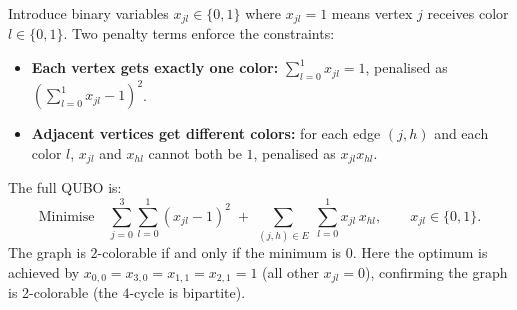\documentclass{ceri/sty/rapport}
\begin{document}
\begin{solution}
Introduce binary variables $x_{jl} \in \{0,1\}$ where $x_{jl} = 1$ means vertex $j$ receives color $l \in \{0,1\}$.
Two penalty terms enforce the constraints:
\begin{itemize}
  \item \textbf{Each vertex gets exactly one color:} $\displaystyle\sum_{l=0}^{1} x_{jl} = 1$,
        penalised as $\left(\sum_{l=0}^{1} x_{jl} - 1\right)^2$.
  \item \textbf{Adjacent vertices get different colors:} for each edge $(j,h)$ and each color $l$,
        $x_{jl}$ and $x_{hl}$ cannot both be $1$, penalised as $x_{jl}x_{hl}$.
\end{itemize}
The full QUBO is:
\[
  \text{Minimise} \quad
  \sum_{j=0}^{3}\sum_{l=0}^{1}\!\left(x_{jl} - 1\right)^2
  \;+\;
  \sum_{(j,h)\in E}\;\sum_{l=0}^{1} x_{jl}\,x_{hl},
  \qquad x_{jl} \in \{0,1\}.
\]
The graph is $2$-colorable if and only if the minimum is $0$.
Here the optimum is achieved by $x_{0,0}=x_{3,0}=x_{1,1}=x_{2,1}=1$ (all other $x_{jl}=0$),
confirming the graph is 2-colorable (the $4$-cycle is bipartite).

\medskip
\begin{center}
\end{center}
\end{solution}
\end{document}
